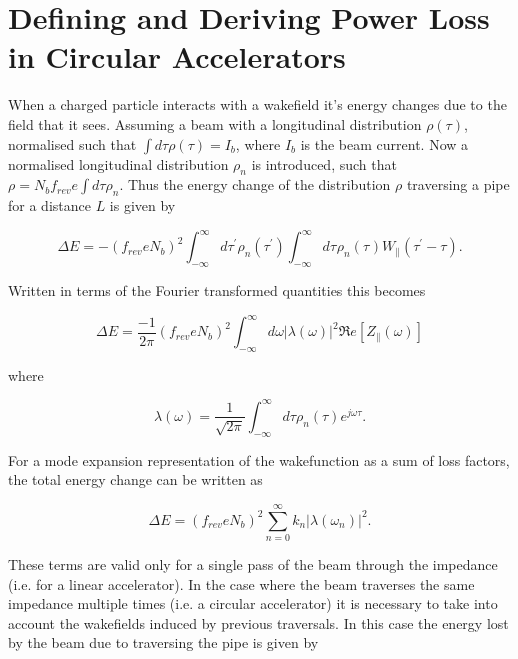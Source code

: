 \documentclass{cernrep}
\begin{document}
\section{Defining and Deriving Power Loss in Circular Accelerators}
\label{sec:power_loss}

When a charged particle interacts with a wakefield it's energy changes due to the field that it sees. Assuming a beam with a longitudinal distribution $\rho (\tau)$, normalised such that $\int d \tau \rho (\tau ) = I_{b}$, where $I_{b}$ is the beam current. Now a normalised longitudinal distribution $\rho_{n}$ is introduced, such that $\rho = N_{b} f_{rev} e \int d \tau \rho_{n}$. Thus the energy change of the distribution $\rho$ traversing a pipe for a distance $L$ is given by \cite{Chao:PhysColEff, Ng:IntDepInstab}

\begin{equation}
\Delta E = - \left( f_{rev} e N_{b}\right)^{2} \int^{\infty}_{-\infty} d\tau^{'} \rho_{n} \left( \tau^{'} \right) \int^{\infty}_{-\infty} d\tau^{} \rho_{n} \left( \tau^{} \right) W_{\parallel} \left( \tau^{'} - \tau \right).  
\end{equation}

Written in terms of the Fourier transformed quantities this becomes

\begin{equation}
\Delta E = \frac{-1}{2\pi}\left( f_{rev} e N_{b}\right)^{2} \int^{\infty}_{-\infty} d\omega \left| \lambda \left( \omega \right)  \right|^{2} \Re{}e \left[ Z_{\parallel} \left( \omega \right) \right]
\end{equation}

where 

\begin{equation}
\lambda \left( \omega \right) = \frac{1}{\sqrt{2 \pi}}\int^{\infty}_{-\infty} d \tau \rho_{n} \left( \tau \right) e^{j\omega \tau}. 
\end{equation}

For a mode expansion representation of the wakefunction as a sum of loss factors, the total energy change can be written as 

\begin{equation}
\Delta E = \left( f_{rev} e N_{b}\right)^{2} \displaystyle\sum\limits_{n = 0}^{\infty} k_{n} \left| \lambda \left( \omega_{n} \right)  \right|^{2}.
\end{equation}

These terms are valid only for a single pass of the beam through the impedance (i.e. for a linear accelerator). In the case where the beam traverses the same impedance multiple times (i.e. a circular accelerator) it is necessary to take into account the wakefields induced by previous traversals. In this case the energy lost by the beam due to traversing the pipe is given by
\end{document}
